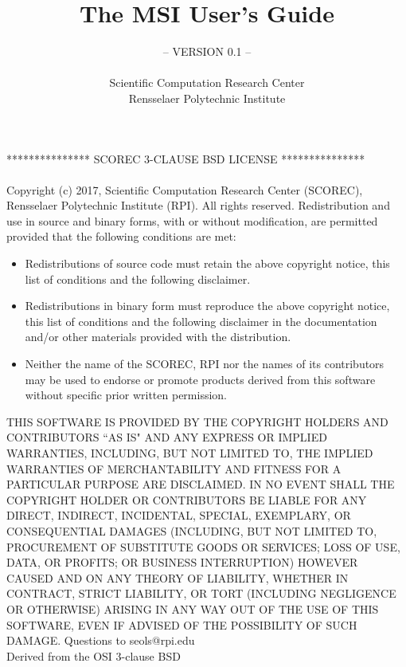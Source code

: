 \documentclass[11pt]{article}  %
\author{}
\title{}
\title{The MSI User's Guide}
\author{-- VERSION 0.1 --\\
\\
Scientific Computation Research Center \\
Rensselaer Polytechnic Institute}
\begin{document}
\maketitle


\newpage

\newpage
***************     SCOREC 3-CLAUSE BSD LICENSE     ***************
\\
\\
Copyright (c) 2017, Scientific Computation Research Center (SCOREC), Rensselaer Polytechnic Institute (RPI). All rights reserved.
\newline
\newline
Redistribution and use in source and binary forms, with or without modification, are permitted provided that the following conditions are met:

\begin{itemize}
\item Redistributions of source code must retain the above copyright notice, this list of conditions and the following disclaimer.

\item Redistributions in binary form must reproduce the above copyright notice, this list of conditions and the following disclaimer in the documentation and/or other materials provided with the distribution.

\item Neither the name of the SCOREC, RPI nor the names of its contributors may be used to endorse or promote products derived from this software without specific prior written permission.
\end{itemize}

THIS SOFTWARE IS PROVIDED BY THE COPYRIGHT HOLDERS AND CONTRIBUTORS ``AS IS" AND ANY EXPRESS OR IMPLIED WARRANTIES, INCLUDING, BUT NOT LIMITED TO, THE IMPLIED WARRANTIES OF MERCHANTABILITY AND FITNESS FOR A PARTICULAR PURPOSE ARE DISCLAIMED. IN NO EVENT SHALL THE COPYRIGHT HOLDER OR CONTRIBUTORS BE LIABLE FOR ANY DIRECT, INDIRECT, INCIDENTAL, SPECIAL, EXEMPLARY, OR CONSEQUENTIAL DAMAGES (INCLUDING, BUT NOT LIMITED TO, PROCUREMENT OF SUBSTITUTE GOODS OR SERVICES; LOSS OF USE, DATA, OR PROFITS; OR BUSINESS INTERRUPTION) HOWEVER CAUSED AND ON ANY THEORY OF LIABILITY, WHETHER IN CONTRACT, STRICT LIABILITY, OR TORT (INCLUDING NEGLIGENCE OR OTHERWISE) ARISING IN ANY WAY OUT OF THE USE OF THIS SOFTWARE, EVEN IF ADVISED OF THE POSSIBILITY OF SUCH DAMAGE.
\newline
\newline
Questions to seols@rpi.edu\\
Derived from the OSI 3-clause BSD
\newpage
\newpage
\end{document}
